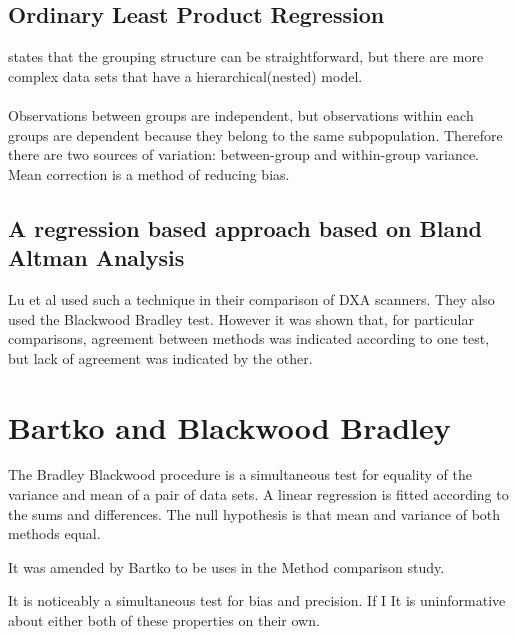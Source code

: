 \documentclass[MAIN.tex]{subfiles}
\begin{document}
\subsection{Ordinary Least Product Regression}
\citet{ludbrook97} states that the grouping structure can be
straightforward, but there are more complex data sets that have a
hierarchical(nested) model.
\\
\\
Observations between groups are independent, but observations
within each groups are dependent because they belong to the same
subpopulation. Therefore there are two sources of variation:
between-group and within-group variance.
\vspace{5 mm} \noindent Mean correction is a method of reducing
bias.







\subsection{A regression based approach based on Bland Altman Analysis}
Lu et al used such a technique in their comparison of DXA
scanners. They also used the Blackwood Bradley test. However it
was shown that, for particular comparisons,  agreement between
methods was indicated according to one test, but lack of agreement
was indicated by the other.



\section{Bartko and Blackwood Bradley}

The Bradley Blackwood procedure is a simultaneous test for equality of the variance and mean of a pair of data sets. 
A linear regression is fitted according to the sums and differences.
The null hypothesis is that mean and variance of both methods equal.





It was amended by Bartko to be uses in the Method comparison study.

It is noticeably a simultaneous test for bias and precision. If I It is uninformative about either both of these properties on their own.
\end{document}

